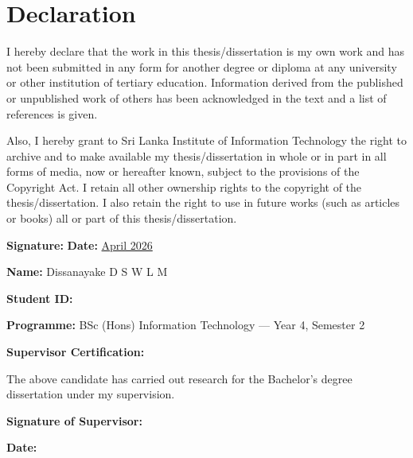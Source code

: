 \documentclass[12pt,a4paper]{report}
\begin{document}
\chapter*{Declaration}

I hereby declare that the work in this thesis/dissertation is my own work and has not been submitted in any form for another degree or diploma at any university or other institution of tertiary education. Information derived from the published or unpublished work of others has been acknowledged in the text and a list of references is given.

\vspace{0.5cm}
\noindent
Also, I hereby grant to Sri Lanka Institute of Information Technology the right to archive and to make available my thesis/dissertation in whole or in part in all forms of media, now or hereafter known, subject to the provisions of the Copyright Act. I retain all other ownership rights to the copyright of the thesis/dissertation. I also retain the right to use in future works (such as articles or books) all or part of this thesis/dissertation.

\vspace{0.8cm}
\noindent
\textbf{Signature:} \underline{\hspace{6.5cm}} \hfill \textbf{Date:} \underline{April 2026}

\vspace{0.4cm}
\noindent
\textbf{Name:} Dissanayake D S W L M

\vspace{0.4cm}
\noindent
\textbf{Student ID:} \underline{\hspace{5cm}}

\vspace{0.4cm}
\noindent
\textbf{Programme:} BSc (Hons) Information Technology — Year 4, Semester 2

\vspace{0.9cm}
\noindent
\textbf{Supervisor Certification:}

\vspace{0.5cm}
\noindent
The above candidate has carried out research for the Bachelor's degree dissertation under my supervision.

\vspace{0.9cm}
\noindent
\textbf{Signature of Supervisor:} \underline{\hspace{6.5cm}}

\vspace{0.4cm}
\noindent
\textbf{Date:} \underline{\hspace{3cm}}
\end{document}
